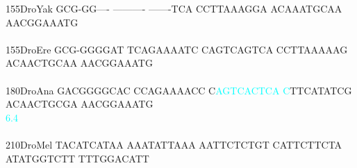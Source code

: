 \documentclass[11pt,twoside,reqno,a4paper]{article}
\begin{document}
{155\hspace*{1\charwidth}DroYak	GCG-GG----	----------	-------TCA	CCTTAAAGGA	ACAAATGCAA	AACGGAAATG	\\
\hspace*{4\charwidth}\hspace*{7\charwidth}\hspace*{1\charwidth}\hspace*{1\charwidth}\hspace*{1\charwidth}\hspace*{1\charwidth}\hspace*{1\charwidth}\hspace*{1\charwidth}\\
155\hspace*{1\charwidth}DroEre	GCG-GGGGAT	TCAGAAAATC	CAGTCAGTCA	CCTTAAAAAG	ACAACTGCAA	AACGGAAATG	\\
\hspace*{4\charwidth}\hspace*{7\charwidth}\hspace*{1\charwidth}\hspace*{1\charwidth}\hspace*{1\charwidth}\hspace*{1\charwidth}\hspace*{1\charwidth}\hspace*{1\charwidth}\\
180\hspace*{1\charwidth}DroAna	GACGGGGCAC	CCAGAAAACC	C\textcolor{cyan}{A}\textcolor{cyan}{G}\textcolor{cyan}{T}\textcolor{cyan}{C}\textcolor{cyan}{A}\textcolor{cyan}{C}\textcolor{cyan}{T}\textcolor{cyan}{C}\textcolor{cyan}{A}	\textcolor{cyan}{C}TTCATATCG	ACAACTGCGA	AACGGAAATG	\\
\hspace*{4\charwidth}\hspace*{7\charwidth}\hspace*{1\charwidth}\hspace*{1\charwidth}\hspace*{21\charwidth}\textcolor{cyan}{6.4}\hspace*{1\charwidth}\hspace*{1\charwidth}\hspace*{1\charwidth}\hspace*{1\charwidth}\\
\\
210\hspace*{1\charwidth}DroMel	TACATCATAA	AAATATTAAA	AATTCTCTGT	CATTCTTCTA	ATATGGTCTT	TTTGGACATT	\\
}
\end{document}
